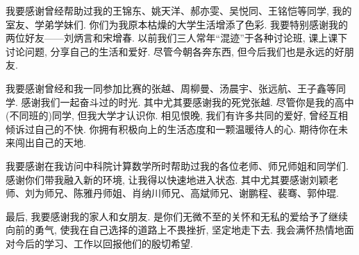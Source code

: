 \documentclass[UTF8,10.5pt,a4paper]{ctexart}
\theoremstyle{definition}
\theoremstyle{definition}
\begin{document}
\par 我要感谢曾经帮助过我的王锦东、姚天洋、郝亦雯、吴悦同、王铭恺等同学, 我的室友、学弟学妹们. 你们为我原本枯燥的大学生活增添了色彩. 我要特别感谢我的两位好友——刘炳言和宋增春. 以前我们三人常年``混迹''于各种讨论班, 课上课下讨论问题, 分享自己的生活和爱好. 尽管今朝各奔东西, 但今后我们也是永远的好朋友. 
\par 我要感谢曾经和我一同参加比赛的张越、周柳曼、汤晨宇、张远航、王子鑫等同学. 感谢我们一起奋斗过的时光. 其中尤其要感谢我的死党张越. 尽管你是我的高中(不同班的)同学, 但我大学才认识你. 相见恨晚, 我们有许多共同的爱好, 曾经互相倾诉过自己的不快. 你拥有积极向上的生活态度和一颗温暖待人的心. 期待你在未来闯出自己的天地.
\par 我要感谢在我访问中科院计算数学所时帮助过我的各位老师、师兄师姐和同学们. 感谢你们带我融入新的环境, 让我得以快速地进入状态. 其中尤其要感谢刘颖老师、刘为师兄、陈雅丹师姐、肖纳川师兄、高斌师兄、谢鹏程、裴骞、郭仲琨.
\par 最后, 我要感谢我的家人和女朋友. 是你们无微不至的关怀和无私的爱给予了继续向前的勇气, 使我在自己选择的道路上不畏挫折, 坚定地走下去. 我会满怀热情地面对今后的学习、工作以回报他们的殷切希望.
\end{document}
